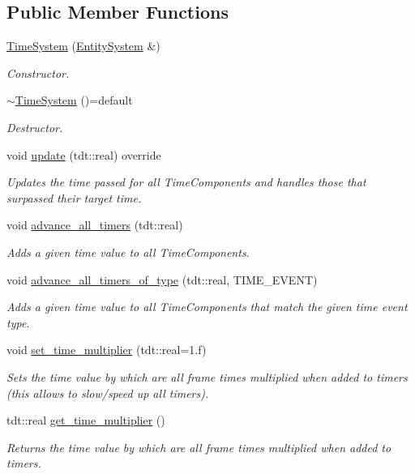 \subsection*{Public Member Functions}
\begin{DoxyCompactItemize}
\item 
\hyperlink{class_time_system_a2e9142b839e77c2f3bdf5f3c5ff96e8a}{Time\+System} (\hyperlink{class_entity_system}{Entity\+System} \&)
\begin{DoxyCompactList}\small\item\em Constructor. \end{DoxyCompactList}\item 
\hyperlink{class_time_system_a4a0dbfdb6c525380cf71cd781aa0a331}{$\sim$\+Time\+System} ()=default
\begin{DoxyCompactList}\small\item\em Destructor. \end{DoxyCompactList}\item 
void \hyperlink{class_time_system_a628f5adf452ee0a1636ef60d78821293}{update} (tdt\+::real) override
\begin{DoxyCompactList}\small\item\em Updates the time passed for all Time\+Components and handles those that surpassed their target time. \end{DoxyCompactList}\item 
void \hyperlink{class_time_system_a63cd114689c43593a022f370889f28c9}{advance\+\_\+all\+\_\+timers} (tdt\+::real)
\begin{DoxyCompactList}\small\item\em Adds a given time value to all Time\+Components. \end{DoxyCompactList}\item 
void \hyperlink{class_time_system_ae953208be9624a219cfda1baf6dfea8c}{advance\+\_\+all\+\_\+timers\+\_\+of\+\_\+type} (tdt\+::real, T\+I\+M\+E\+\_\+\+E\+V\+E\+NT)
\begin{DoxyCompactList}\small\item\em Adds a given time value to all Time\+Components that match the given time event type. \end{DoxyCompactList}\item 
void \hyperlink{class_time_system_a7baaad1d6985006ed5e247fc9896b6cd}{set\+\_\+time\+\_\+multiplier} (tdt\+::real=1.f)
\begin{DoxyCompactList}\small\item\em Sets the time value by which are all frame times multiplied when added to timers (this allows to slow/speed up all timers). \end{DoxyCompactList}\item 
tdt\+::real \hyperlink{class_time_system_a8f4e42fc4fdbdadcaca49b36a2a181cb}{get\+\_\+time\+\_\+multiplier} ()
\begin{DoxyCompactList}\small\item\em Returns the time value by which are all frame times multiplied when added to timers. \end{DoxyCompactList}\end{DoxyCompactItemize}
